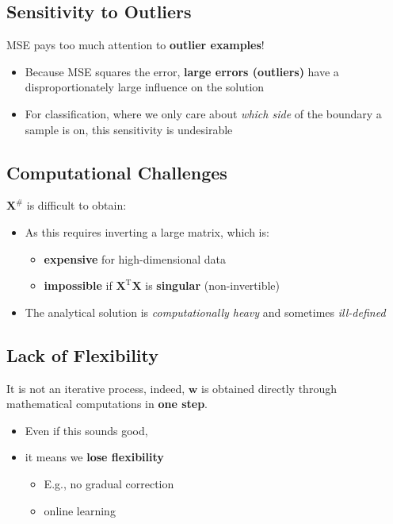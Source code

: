 \documentclass[11pt,a4paper]{article}
\theoremstyle{definition}
\theoremstyle{plain}
\theoremstyle{remark}
\begin{document}
\subsection{Sensitivity to Outliers}

\begin{tcolorbox}[colback=red!10!white,colframe=red!75!black,title=\textbf{Warning: Outlier Sensitivity}]
MSE pays too much attention to \textbf{outlier examples}!

\begin{itemize}
    \item Because MSE squares the error, \textbf{large errors (outliers)} have a disproportionately large influence on the solution
    
    \item For classification, where we only care about \textit{which side} of the boundary a sample is on, this sensitivity is undesirable
\end{itemize}
\end{tcolorbox}

\subsection{Computational Challenges}

$\mathbf{X}^{\#}$ is difficult to obtain:
\begin{itemize}
    \item As this requires inverting a large matrix, which is:
    \begin{itemize}
        \item \textbf{expensive} for high-dimensional data
        \item \textbf{impossible} if $\mathbf{X}^{\mathrm{T}}\mathbf{X}$ is \textbf{singular} (non-invertible)
    \end{itemize}
    
    \item The analytical solution is \textit{computationally heavy} and sometimes \textit{ill-defined}
\end{itemize}

\subsection{Lack of Flexibility}

It is not an iterative process, indeed, $\mathbf{w}$ is obtained directly through mathematical computations in \textbf{one step}.

\begin{itemize}
    \item Even if this sounds good,
    \item it means we \textbf{lose flexibility}
    \begin{itemize}
        \item E.g., no gradual correction
        \item online learning
    \end{itemize}
\end{itemize}
\end{document}
